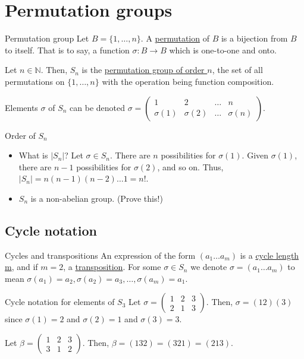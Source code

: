 \documentclass[12pt]{article}
\newcommand{\N}{\mathbb{N}}
\begin{document}
	\section{Permutation groups}
	\begin{mydef}{Permutation group}{}
		Let $B=\{1, \dots, n\}$. A \underline{permutation} of $B$ is a bijection from $B$ to itself. That is to say, a function $\sigma:B\to B$ which is one-to-one and onto.
		
		Let $n\in\N$. Then, $S_n$ is the \underline{permutation group of order $n$}, the set of all permutations on $\{1, \dots, n\}$ with the operation being function composition.
		
		Elements $\sigma$ of $S_n$ can be denoted $\sigma=\begin{pmatrix}1&2&\dots&n\\\sigma(1)&\sigma(2)&\dots&\sigma(n)\end{pmatrix}$.
	\end{mydef}
	
	\begin{myrem}{Order of $S_n$}{}
		\begin{itemize}
			\item What is $|S_n|$? Let $\sigma\in S_n$. There are $n$ possibilities for $\sigma(1)$. Given $\sigma(1)$, there are $n-1$ possibilities for $\sigma(2)$, and so on. Thus, $|S_n|=n(n-1)(n-2)\dots1=n!$.
			
			\item $S_n$ is a non-abelian group. (Prove this!)
		\end{itemize}
	\end{myrem}
	
	\subsection{Cycle notation}
	\begin{mydef}{Cycles and transpositions}{}
		An expression of the form $(a_1\dots a_m)$ is a \underline{cycle length m}, and if $m=2$, a \underline{transposition}. For some $\sigma\in S_n$ we denote $\sigma=(a_1\dots a_m)$ to mean $\sigma(a_1)=a_2, \sigma(a_2)=a_3, \dots, \sigma(a_m)=a_1$.
	\end{mydef}
	
	\begin{myex}{Cycle notation for elements of $S_3$}{}
		Let $\sigma=\begin{pmatrix}1&2&3\\2&1&3\end{pmatrix}$. Then, $\sigma=(12)(3)$ since $\sigma(1)=2$ and $\sigma(2)=1$ and $\sigma(3)=3$.
		
		Let $\beta=\begin{pmatrix}1&2&3\\3&1&2\end{pmatrix}$. Then, $\beta=(132)=(321)=(213)$.
	\end{myex}
	
\end{document}
